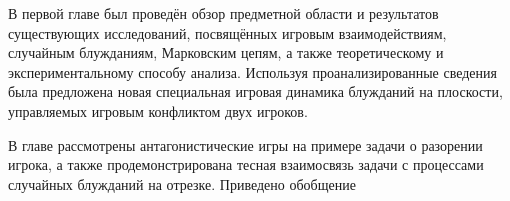 В первой главе был проведён обзор предметной области и результатов
существующих исследований, посвящённых игровым взаимодействиям, случайным блужданиям,
Марковским цепям, а также теоретическому и экспериментальному способу анализа.
Используя проанализированные сведения была предложена новая специальная игровая динамика блужданий
на плоскости, управляемых игровым конфликтом двух игроков.

В главе рассмотрены антагонистические игры на примере задачи о разорении игрока, а также
продемонстрирована тесная взаимосвязь задачи с процессами случайных блужданий на отрезке.
Приведено обобщение 







